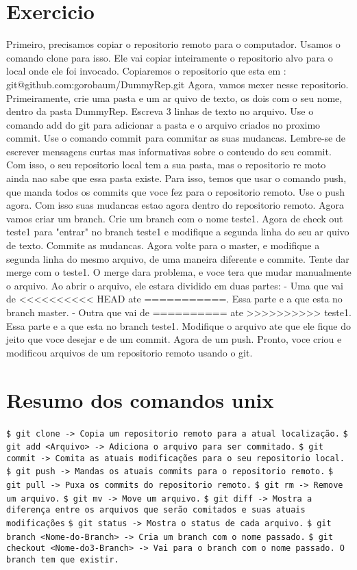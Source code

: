 \documentclass[12pt,onecolumn]{article}
\begin{document}
\section{Exercicio}
    Primeiro, precisamos copiar o repositorio remoto para o computador. Usamos o
comando clone para isso. Ele vai copiar inteiramente o repositorio alvo para o 
local onde ele foi invocado. Copiaremos o repositorio que esta em :
    git@github.com:gorobaum/DummyRep.git 
    Agora, vamos mexer nesse repositorio. Primeiramente, crie uma pasta e um ar
quivo de texto, os dois com o seu nome, dentro da pasta DummyRep. Escreva 3 linhas
de texto no arquivo. Use o comando add do git para adicionar a pasta e o arquivo
criados no proximo commit. Use o comando commit para commitar as suas mudancas.
Lembre-se de escrever mensagens curtas mas informativas sobre o conteudo do seu 
commit. Com isso, o seu repositorio local tem a sua pasta, mas o repositorio re
moto ainda nao sabe que essa pasta existe. Para isso, temos que usar o comando
push, que manda todos os commits que voce fez para o repositorio remoto. Use
o push agora. Com isso suas mudancas estao agora dentro do repositorio remoto.
    Agora vamos criar um branch. Crie um branch com o nome teste1. Agora de check
out teste1 para "entrar" no branch teste1 e modifique a segunda linha do seu ar
quivo de texto. Commite as mudancas. Agora volte para o master, e modifique a 
segunda linha do mesmo arquivo, de uma maneira diferente e commite. Tente dar 
merge com o teste1. O merge dara problema, e voce tera que mudar manualmente o 
arquivo. Ao abrir o arquivo, ele estara dividido em duas partes:
    - Uma que vai de <<<<<<<<<< HEAD ate ===========. Essa parte e a que esta no
branch master.
    - Outra que vai de ========== ate >>>>>>>>>> teste1. Essa parte e a que esta
no branch teste1.
Modifique o arquivo ate que ele fique do jeito que voce desejar e de um commit.
Agora de um push. Pronto, voce criou e modificou arquivos de um repositorio 
remoto usando o git.

\section{Resumo dos comandos unix}
\verb#$ git clone -> Copia um repositorio remoto para a atual localização.#
\verb#$ git add <Arquivo> -> Adiciona o arquivo para ser commitado.#
\verb#$ git commit -> Comita as atuais modificações para o seu repositorio local.#
\verb#$ git push -> Mandas os atuais commits para o repositorio remoto.#
\verb#$ git pull -> Puxa os commits do repositorio remoto.#
\verb#$ git rm -> Remove um arquivo.#
\verb#$ git mv -> Move um arquivo.#
\verb#$ git diff -> Mostra a diferença entre os arquivos que serão comitados e suas atuais modificações#
\verb#$ git status -> Mostra o status de cada arquivo.#
\verb#$ git branch <Nome-do-Branch> -> Cria um branch com o nome passado.#
\verb#$ git checkout <Nome-do3-Branch> -> Vai para o branch com o nome passado. O branch tem que existir.#
\end{document}

